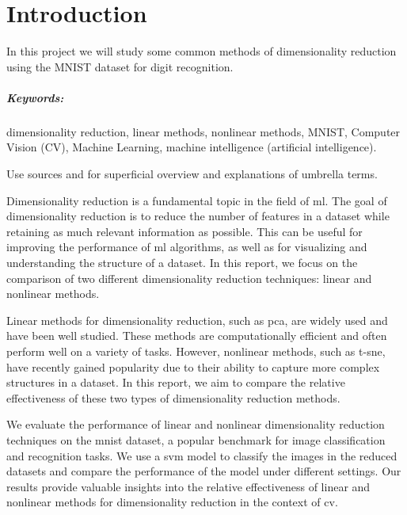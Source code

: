 \chapter{Introduction}\label{cha:introduction}
\noindent
In this project we will study some common methods of dimensionality reduction using the MNIST dataset for digit recognition.

\paragraph{Keywords:} dimensionality reduction, linear methods, nonlinear methods, MNIST, Computer Vision (CV), Machine Learning, machine intelligence (artificial intelligence).

Use sources \cite{IBM-machine-intelligence} and \cite{IBM-computer-vision} for superficial overview and explanations of umbrella terms.


Dimensionality reduction is a fundamental topic in the field of \gls{ml}. The goal of dimensionality reduction is to reduce the number of features in a dataset while retaining as much relevant information as possible. This can be useful for improving the performance of \gls{ml} algorithms, as well as for visualizing and understanding the structure of a dataset. In this report, we focus on the comparison of two different dimensionality reduction techniques: linear and nonlinear methods.

Linear methods for dimensionality reduction, such as \gls{pca}, are widely used and have been well studied. These methods are computationally efficient and often perform well on a variety of tasks. However, nonlinear methods, such as \gls{t-sne}, have recently gained popularity due to their ability to capture more complex structures in a dataset. In this report, we aim to compare the relative effectiveness of these two types of dimensionality reduction methods.

We evaluate the performance of linear and nonlinear dimensionality reduction techniques on the \gls{mnist} dataset, a popular benchmark for image classification and recognition tasks. We use a \gls{svm} model to classify the images in the reduced datasets and compare the performance of the model under different settings. Our results provide valuable insights into the relative effectiveness of linear and nonlinear methods for dimensionality reduction in the context of \gls{cv}.

